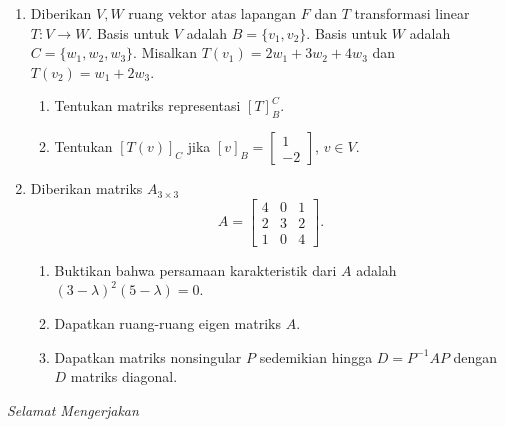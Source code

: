 \documentclass[11pt,a4paper]{article}
\begin{document}
\begin{enumerate}[resume=soal]
  \item Diberikan $V,W$ ruang vektor atas lapangan $F$ dan $T$ transformasi linear $T:V\to W$.
        Basis untuk $V$ adalah $B=\{v_1,v_2\}$.
        Basis untuk $W$ adalah $C=\{w_1,w_2,w_3\}$.
        Misalkan $T(v_1)=2w_1+3w_2+4w_3$ dan $T(v_2)=w_1+2w_3$.
        \begin{enumerate}
          \item Tentukan matriks representasi $[T]_B^C$.
          \item Tentukan $[T(v)]_C$ jika $[v]_B=\begin{bmatrix}1\\-2\end{bmatrix}$, $v\in V$.
        \end{enumerate}

  \item Diberikan matriks $A_{3\times3}$
        \[
          A=\begin{bmatrix}4&0&1\\2&3&2\\1&0&4\end{bmatrix}.
        \]
        \begin{enumerate}
          \item Buktikan bahwa persamaan karakteristik dari $A$ adalah $(3-\lambda)^2(5-\lambda)=0$.
          \item Dapatkan ruang-ruang eigen matriks $A$.
          \item Dapatkan matriks nonsingular $P$ sedemikian hingga $D=P^{-1}AP$ dengan $D$ matriks diagonal.
        \end{enumerate}
\end{enumerate}

\vfill
\begin{center}
  \textit{Selamat Mengerjakan}
\end{center}
\newpage
\end{document}
